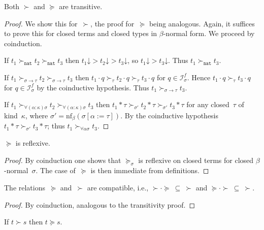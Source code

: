\documentclass[a4paper,UKenglish,cleveref,autoref,numberwithinsect]{lipics-v2019}
\theoremstyle{definition}
\newcommand{\Iterms}{\mathcal{I}}
\newcommand{\arrtype}{\rightarrow}
\newcommand{\app}[2]{#1 \cdot #2}
\newcommand{\tapp}[2]{#1 * #2}
\newcommand{\subst}[2]{#1:=#2}
\newcommand{\nat}{\mathtt{nat}}
\newcommand{\nf}{\mathrm{nf}}
\newcommand{\da}{\mathord{\downarrow}}
\begin{document}
\begin{lemma}\label{lem_transitive}
  Both $\succ$ and $\succeq$ are transitive.
\end{lemma}

\begin{proof}
  We show this for~$\succ$, the proof for~$\succeq$ being
  analogous. Again, it suffices to prove this for closed
  terms and closed types in $\beta$-normal form. We proceed by
  coinduction.

  If $t_1 \succ_\nat t_2 \succ_\nat t_3$ then $t_1\da > t_2\da >
  t_3\da$, so $t_1\da > t_3\da$. Thus $t_1 \succ_\nat t_3$.

  If $t_1 \succ_{\sigma\arrtype\tau}t_2\succ_{\sigma\arrtype\tau}t_3$
  then $\app{t_1}{q}\succ_{\tau}\app{t_2}{q}\succ_\tau\app{t_3}{q}$
  for $q \in \Iterms^f_\sigma$. Hence
  $\app{t_1}{q}\succ_\tau\app{t_3}{q}$ for $q \in \Iterms^f_\sigma$ by
  the coinductive hypothesis. Thus $t_1\succ_{\sigma\arrtype\tau}
  t_3$.

  If $t_1
  \succ_{\forall(\alpha:\kappa)\sigma}t_2\succ_{\forall(\alpha:\kappa)\sigma}t_3$
  then
  $\tapp{t_1}{\tau}\succ_{\sigma'}\tapp{t_2}{\tau}\succ_{\sigma'}\tapp{t_3}{\tau}$
  for any closed~$\tau$ of kind~$\kappa$, where
  $\sigma' = \nf_\beta(\sigma[\subst{\alpha}{\tau}])$. By the
  coinductive hypothesis
  $\tapp{t_1}{\tau}\succ_{\sigma'}\tapp{t_3}{\tau}$; thus
  $t_1\succ_{\forall\alpha\sigma}t_3$.
\end{proof}

\begin{lemma}\label{lem_reflexive}
  $\succeq$ is reflexive.
\end{lemma}

\begin{proof}
  By coinduction one shows that $\succeq_\sigma$ is reflexive on
  closed terms for closed $\beta$-normal~$\sigma$. The case
  of~$\succeq$ is then immediate from definitions.
\end{proof}

\begin{lemma}\label{lem:compatibility}
  The relations~$\succeq$ and~$\succ$ are compatible, i.e., $\succ
  \cdot \succeq\ \subseteq\ \succ$ and $\succeq \cdot
  \succ\ \subseteq\ \succ$.
\end{lemma}

\begin{proof}
  By coinduction, analogous to the transitivity proof.
\end{proof}

\begin{lemma}\label{lem_succ_to_succeq}
  If $t \succ s$ then $t \succeq s$.
\end{lemma}
\end{document}
